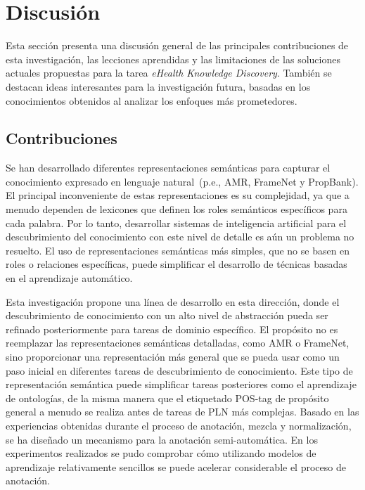 \section{Discusión}
\label{chap2:discussion}

Esta sección presenta una discusión general de las principales contribuciones de esta investigación, las lecciones aprendidas y las limitaciones de las soluciones actuales propuestas para la tarea \textit{eHealth Knowledge Discovery}. También se destacan ideas interesantes para la investigación futura, basadas en los conocimientos obtenidos al analizar los enfoques más prometedores.

\subsection{Contribuciones}

Se han desarrollado diferentes representaciones semánticas para capturar el conocimiento expresado en lenguaje natural~(p.e., AMR, FrameNet y PropBank).
El principal inconveniente de estas representaciones es su complejidad, ya que a menudo dependen de lexicones que definen los roles semánticos específicos para cada palabra.
Por lo tanto, desarrollar sistemas de inteligencia artificial para el descubrimiento del conocimiento con este nivel de detalle es aún un problema no resuelto.
El uso de representaciones semánticas más simples, que no se basen en roles o relaciones específicas, puede simplificar el desarrollo de técnicas basadas en el aprendizaje automático.

Esta investigación propone una línea de desarrollo en esta dirección, donde el descubrimiento de conocimiento con un alto nivel de abstracción pueda ser refinado posteriormente para tareas de dominio específico.
El propósito no es reemplazar las representaciones semánticas detalladas, como AMR o FrameNet, sino proporcionar una representación más general que se pueda usar como un paso inicial en diferentes tareas de descubrimiento de conocimiento.
Este tipo de representación semántica puede simplificar tareas posteriores como el aprendizaje de ontologías, de la misma manera que el etiquetado POS-tag de propósito general a menudo se realiza antes de tareas de PLN más complejas.
Basado en las experiencias obtenidas durante el proceso de anotación, mezcla y normalización, se ha diseñado un mecanismo para la anotación semi-automática.
En los experimentos realizados se pudo comprobar cómo utilizando modelos de aprendizaje relativamente sencillos se puede acelerar considerable el proceso de anotación.

